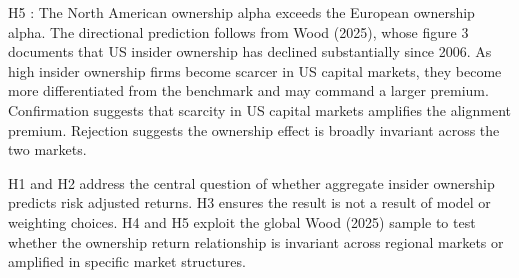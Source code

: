 H5 : The North American ownership alpha exceeds the European ownership alpha. The directional prediction follows from Wood (2025), whose figure 3 documents that US insider ownership has declined substantially since 2006. As high insider ownership firms become scarcer in US capital markets, they become more differentiated from the benchmark and may command a larger premium. Confirmation suggests that scarcity in US capital markets amplifies the alignment premium. Rejection suggests the ownership effect is broadly invariant across the two markets.

H1 and H2 address the central question of whether aggregate insider ownership predicts risk adjusted returns. H3 ensures the result is not a result of model or weighting choices. H4 and H5 exploit the global Wood (2025) sample to test whether the ownership return relationship is invariant across regional markets or amplified in specific market structures.
